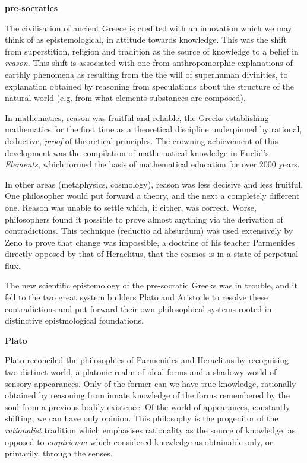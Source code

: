 \documentclass[14pt,titlepage]{extarticle}
\begin{document}
\begin{description}
\item{\bf pre-socratics}
  
    The civilisation of ancient Greece is credited with an innovation which we may think of as epistemological, in attitude towards knowledge.
    This was the shift from superstition, religion and tradition as the source of knowledge to a belief in \emph{reason}.
    This shift is associated with one from anthropomorphic explanations of earthly phenomena as resulting from the the will of superhuman divinities, to explanation obtained by reasoning from speculations about the structure of the natural world (e.g. from what elements substances are composed).

    In mathematics, reason was fruitful and reliable, the Greeks establishing mathematics for the first time as a theoretical discipline underpinned by rational, deductive, \emph{proof} of theoretical principles.
    The crowning achievement of this development was the compilation of mathematical knowledge in Euclid's \emph{Elements}, which formed the basis of mathematical education for over 2000 years.

    In other areas (metaphysics, cosmology), reason was less decisive and less fruitful.
    One philosopher would put forward a theory, and the next a completely different one.
    Reason was unable to settle which, if either, was correct.
    Worse, philosophers found it possible to prove almost anything via the derivation of contradictions.
    This technique (reductio ad absurdum) was used extensively by Zeno to prove that change was impossible, a doctrine of his teacher Parmenides directly opposed by that of Heraclitus, that the cosmos is in a state of perpetual flux.

    The new scientific epistemology of the pre-socratic Greeks was in trouble, and it fell to the two great system builders Plato and Aristotle to resolve these contradictions and put forward their own philosophical systems rooted in distinctive epistmological foundations. 
    
  \item{\bf Plato}

    Plato reconciled the philosophies of Parmenides and Heraclitus by recognising two distinct world, a platonic realm of ideal forms and a shadowy world of sensory appearances.
    Only of the former can we have true knowledge, rationally obtained by reasoning from innate knowledge of the forms remembered by the soul from a previous bodily existence.
    Of the world of appearances, constantly shifting, we can have only opinion.
    This philosophy is the progenitor of the \emph{rationalist} tradition which emphasises rationality as the source of knowledge, as opposed to \emph{empiricism} which considered knowledge as obtainable only, or primarily, through the senses.
    

\end{description}
\end{document}
